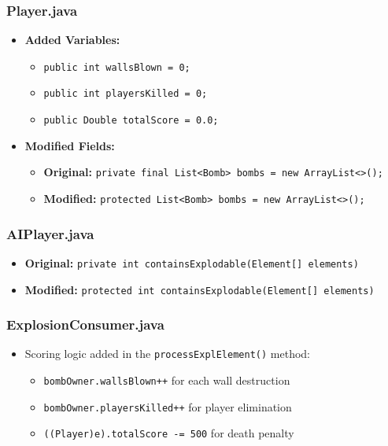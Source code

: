 \documentclass[sigconf]{acmart} %
\begin{document}
\subsubsection{\textbf{Player.java}}
\begin{itemize}
    \item \textbf{Added Variables:}
    \begin{itemize}
        \item \texttt{public int wallsBlown = 0;}
        \item \texttt{public int playersKilled = 0;}
        \item \texttt{public Double totalScore = 0.0;}
    \end{itemize}
    \item \textbf{Modified Fields:}
    \begin{itemize}
        \item \textbf{Original:} \texttt{private final List<Bomb> bombs = new ArrayList<>();}
        \item \textbf{Modified:} \texttt{protected List<Bomb> bombs = new ArrayList<>();}
    \end{itemize}
\end{itemize}

\subsubsection{\textbf{AIPlayer.java}}
\begin{itemize}
    \item \textbf{Original:} \texttt{private int containsExplodable(Element[] elements)}
    \item \textbf{Modified:} \texttt{protected int containsExplodable(Element[] elements)}
\end{itemize}

\subsubsection{\textbf{ExplosionConsumer.java}}
\begin{itemize}
    \item Scoring logic added in the \texttt{processExplElement()} method:
    \begin{itemize}
        \item \texttt{bombOwner.wallsBlown++} for each wall destruction 
        \item \texttt{bombOwner.playersKilled++} for player elimination
        \item \texttt{((Player)e).totalScore -= 500} for death penalty
    \end{itemize}
\end{itemize}
\end{document}
